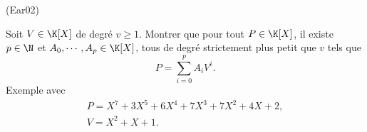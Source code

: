 \begin{tiny}(Ear02)\end{tiny} Soit $V\in \K[X]$ de degré $v\geq 1$. Montrer que pour tout $P\in \K[X]$, il existe $p\in \N$ et $A_0, \cdots , A_p \in \K[X]$, tous de degré strictement plus petit que $v$ tels que
\[
 P = \sum_{i = 0}^{p}A_i V^i.
\]
Exemple avec
\begin{multline*}
 P = X^7 + 3X^5 + 6X^4 + 7X^3 + 7X^2 + 4X + 2, \\
 V = X^2 + X + 1.
\end{multline*}
